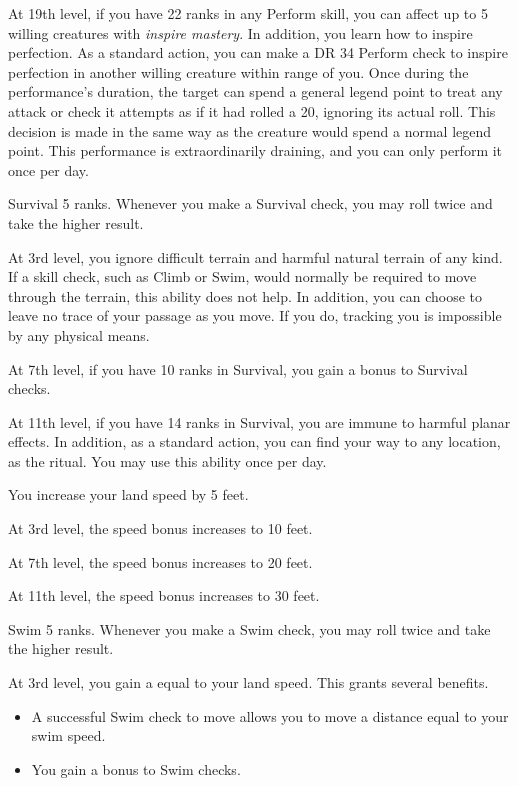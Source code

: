     At 19th level, if you have 22 ranks in any Perform skill, you can affect up to 5 willing creatures with \textit{inspire mastery}.
    In addition, you learn how to inspire perfection.
     As a standard action, you can make a DR 34 Perform check to inspire perfection in another willing creature within \rngmed range of you.
    Once during the performance's duration, the target can spend a general legend point to treat any attack or check it attempts as if it had rolled a 20, ignoring its actual roll.
    This decision is made in the same way as the creature would spend a normal legend point.
    This performance is extraordinarily draining, and you can only perform it once per day.

    \featpre Survival 5 ranks.
    \featben Whenever you make a Survival check, you may roll twice and take the higher result.

    At 3rd level, you ignore difficult terrain and harmful natural terrain of any kind.
    If a skill check, such as Climb or Swim, would normally be required to move through the terrain, this ability does not help.
    In addition, you can choose to leave no trace of your passage as you move.
    If you do, tracking you is impossible by any physical means.

    At 7th level, if you have 10 ranks in Survival, you gain a  bonus to Survival checks.

    At 11th level, if you have 14 ranks in Survival, you are immune to harmful planar effects.
    In addition, as a standard action, you can find your way to any location, as the  ritual.
    You may use this ability once per day.

    \featben You increase your land speed by 5 feet.

    At 3rd level, the speed bonus increases to 10 feet.

    At 7th level, the speed bonus increases to 20 feet.

    At 11th level, the speed bonus increases to 30 feet.

    \featpre Swim 5 ranks.
    \featben Whenever you make a Swim check, you may roll twice and take the higher result.

    At 3rd level, you gain a  equal to your land speed.
    This grants several benefits.
    \begin{itemize}
        \item A successful Swim check to move allows you to move a distance equal to your swim speed.
        \item You gain a  bonus to Swim checks.
    \end{itemize}

